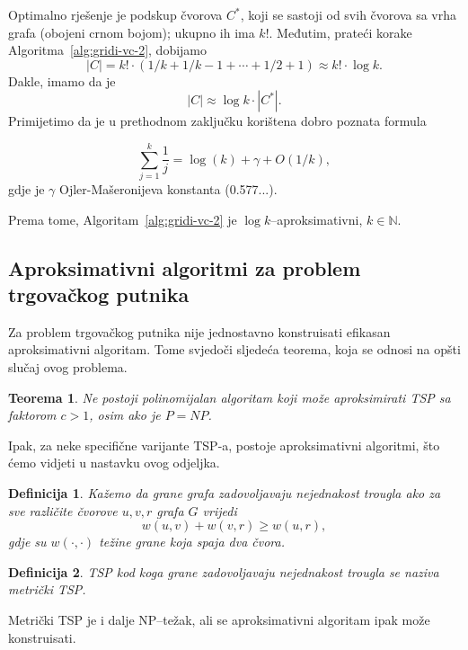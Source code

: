 \documentclass[b5paper, utf8, 11pt, colorlinks]{book}
\newtheorem{definition}{Definicija}[chapter]
\newtheorem{thm}{Teorema}[chapter]
\theoremstyle{definition}
\begin{document}
  Optimalno rješenje je podskup čvorova $C^*$, koji se sastoji od svih čvorova sa vrha grafa (obojeni crnom bojom); ukupno ih ima $k!$. Međutim, prateći korake Algoritma~\ref{alg:gridi-vc-2}, dobijamo $$|C| = k!\cdot( 1/k + 1/k-1 + \cdots + 1/2 + 1) \approx k! \cdot \log k.$$  
  Dakle, imamo da je
  $$   |C| \approx \log k \cdot |C^*|.$$ 
  Primijetimo da je u prethodnom zaključku korištena dobro poznata formula 
  
  $$\sum_{j=1}^k \frac1{j} = \log(k)+\gamma+O(1/k),$$
  gdje je $\gamma$ Ojler-Mašeronijeva konstanta (0.577...).
  
  Prema tome, Algoritam~\ref{alg:gridi-vc-2} je $\log k$--aproksimativni, $k \in \mathbb{N}$. 
 

  \subsection{Aproksimativni algoritmi za problem trgovačkog putnika}
  
  Za problem trgovačkog putnika nije jednostavno konstruisati efikasan aproksimativni algoritam. Tome svjedoči sljedeća teorema, koja se odnosi na opšti slučaj ovog problema.
  
 \begin{thm}
    Ne postoji polinomijalan algoritam koji može aproksimirati TSP sa  faktorom $c > 1$, osim ako je $P = NP$. 
\end{thm}

Ipak, za neke specifične varijante TSP-a, postoje aproksimativni algoritmi, što ćemo vidjeti u nastavku ovog odjeljka. 
\begin{definition}
  Kažemo da grane grafa zadovoljavaju nejednakost trougla ako za sve različite čvorove $u,v, r$ grafa $G$ vrijedi
  $$ w(u,v) + w(v,r) \geq w(u,r),$$
  gdje su $w(\cdot, \cdot)$ težine grane koja spaja dva čvora.
  \end{definition}
  
  \begin{definition} 
TSP kod koga grane zadovoljavaju nejednakost trougla se naziva \emph{metrički} TSP.
  \end{definition}
  
   Metrički TSP je i dalje NP--težak, ali se aproksimativni algoritam ipak može konstruisati. 
\end{document}
